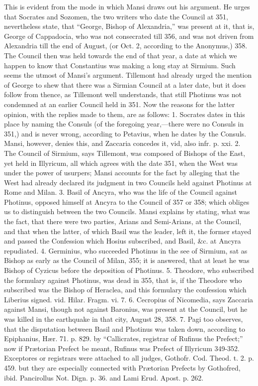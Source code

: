 This is evident from the mode
in which Mansi draws out his argument. He urges that Socrates and
Sozomen, the two writers who date the Council at 351, nevertheless
state, that “George, Bishop of Alexandria,” was present at it,
that is, George of Cappadocia, who was not consecrated till 356, and
was not driven from Alexandria till the end of August, (or Oct. 2,
according to the Anonymus,) 358. The Council then was held towards the
end of that year, a date at which we happen to know that Constantius
was making a long stay at Sirmium. Such seems the utmost of Mansi's
argument. Tillemont had already urged the mention of George to shew
that there was a Sirmian Council at a later date, but it does follow
from thence, as Tillemont well understands, that still Photinus was
not condemned at an earlier Council held in 351. Now the reasons for
the latter opinion, with the replies made to them, are as follows: 1.
Socrates dates in this place by naming the Consuls (of the foregoing
year,—there were no Consuls in 351,) and is never wrong, according
to Petavius, when he dates by the Consuls. Mansi, however,
denies this, and Zaccaria concedes it, vid, also infr. p. xxi. 2. The
Council of Sirmium, says Tillemont, was composed of Bishops of the
East, yet held in Illyricum, all which agrees with the date 351, when
the West was under the power of usurpers; Mansi accounts for the fact
by alleging that the West had already declared its judgment in two
Councils held against Photinus at Rome and Milan. 3. Basil of Ancyra,
who was the life of the Council against Photinus, opposed himself at
Ancyra to the Council of 357 or 358; which obliges us to distinguish
between the two Councils. Mansi explains by stating, what was the
fact, that there were two parties, Arians and Semi-Arians, at the
Council, and that when the latter, of which Basil was the leader, left
it, the former stayed and passed the Confession which Hosius
subscribed, and Basil, \&c. at Ancyra repudiated. 4. Germinius, who
succeeded Photinus in the see of Sirmium, sat as Bishop as early as
the Council of Milan, 355; it is answered, that at least he was Bishop
of Cyzicus before the deposition of Photinus. 5. Theodore, who
subscribed the formulary against Photinus, was dead in 355, that is,
if the Theodore who subscribed was the Bishop of Heraclea, and this
formulary the confession which Liberius signed. vid. Hilar. Fragm. vi.
7. 6. Cecropius of Nicomedia, says Zaccaria against Mansi, though not
against Baronius, was present at the Council, but he was killed in the
earthquake in that city, August 28, 358. 7. Pagi too observes, that
the disputation between Basil and Photinus was taken down, according
to Epiphanius, Hær. 71. p. 829. by “Callicrates, registrar of
Rufinus the Prefect;” now if Prætorian Prefect be meant, Rufinus
was Prefect of Illyricum 349-352. Exceptores or registrars were
attached to all judges, Gothofr. Cod. Theod. t. 2. p. 459. but they
are especially connected with Prætorian Prefects by Gothofred, ibid.
Pancirollus Not. Dign. p. 36. and Lami Erud. Apost. p. 262.

